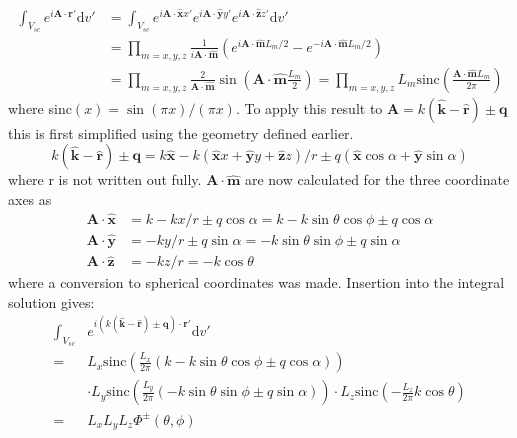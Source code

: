 \documentclass[11pt,twoside]{eitExjobb}
\begin{document}
	\begin{equation*}
	\begin{split}
		\int_{V_{sc}} e^{i\bm{A} \cdot \bm{r}'} \mathrm{d}v' &=
		\int_{V_{sc}} e^{i\bm{A} \cdot \bm{\hat{x}} x'} e^{i\bm{A} \cdot \bm{\hat{y}} y'} e^{i\bm{A} \cdot \bm{\hat{z}} z'} \mathrm{d}v' \\
		&= \prod_{m = x,y,z} \frac{1}{i \bm{A} \cdot \bm{\hat{m}}} \left( e^{i\bm{A} \cdot \bm{\hat{m}} L_m/2} - e^{-i\bm{A} \cdot \bm{\hat{m}} L_m/2} \right) \\
		&= \prod_{m = x,y,z} \frac{2}{\bm{A} \cdot \bm{\hat{m}}} \sin \left(\bm{A} \cdot \bm{\hat{m}} \frac{L_m}{2} \right) 
		= \prod_{m = x,y,z} L_m \text{sinc} \left( \frac{\bm{A} \cdot \bm{\hat{m}} L_m}{2\pi} \right)
	\end{split}
	\end{equation*}
	where sinc$(x) = \sin(\pi x)/(\pi x)$. To apply this result to $\bm{A} = k(\bm{\hat{k}} - \bm{\hat{r}}) \pm \bm{q}$ this is first simplified using the geometry defined earlier.
	\begin{equation*}
		k(\bm{\hat{k}} - \bm{\hat{r}}) \pm \bm{q} = k\bm{\hat{x}} - k(\bm{\hat{x}} x + \bm{\hat{y}} y + \bm{\hat{z}} z)/r \pm q(\bm{\hat{x}} \cos{\alpha} + \bm{\hat{y}} \sin{\alpha})
	\end{equation*}
	where r is not written out fully. $\bm{A} \cdot \bm{\hat{m}}$ are now calculated for the three coordinate axes as
	\begin{equation} 
	\begin{split}
		\bm{A} \cdot \bm{\hat{x}} &= k - kx/r \pm q\cos{\alpha} = k - k\sin{\theta}\cos{\phi} \pm q\cos{\alpha} \\
		\bm{A} \cdot \bm{\hat{y}} &= - ky/r \pm q\sin{\alpha} = - k\sin{\theta}\sin{\phi} \pm q\sin{\alpha} \\
		\bm{A} \cdot \bm{\hat{z}} &= -kz/r = -k\cos{\theta}
	\end{split}
	\label{eq:radar-Aproj}
	\end{equation}
	where a conversion to spherical coordinates was made. Insertion into the integral solution gives:
	\begin{equation}
		\begin{split} 
			\int_{V_{sc}} &e^{i(	k(\bm{\hat{k}} - \bm{\hat{r}}) \pm \bm{q}) \cdot \bm{r}'} \mathrm{d}v' \\
			=& L_x \text{sinc} \left( \frac{L_x}{2\pi} ( k - k\sin{\theta}\cos{\phi} \pm q\cos{\alpha} ) \right) \\
			&\cdot L_y \text{sinc} \left( \frac{L_y}{2\pi} ( - k\sin{\theta}\sin{\phi} \pm q\sin{\alpha} ) \right)
			\cdot L_z \text{sinc} \left( -\frac{L_z}{2\pi} k\cos{\theta} \right) \\
			=& L_x L_y L_z \Phi^\pm (\theta,\phi)
		\end{split}
		\label{eq:radar-intsol}
	\end{equation}
	
\end{document}
